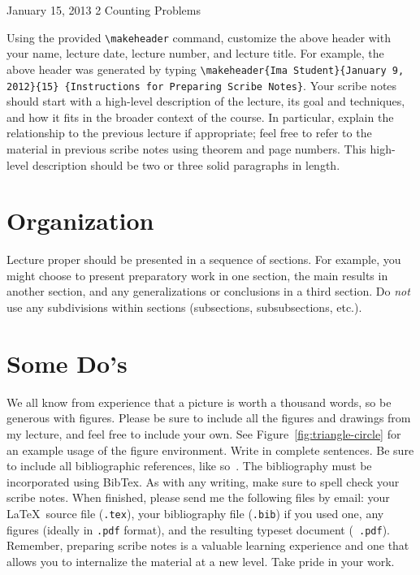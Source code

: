            {January 15, 2013}                          %
           {2}                                       %
           {Counting Problems}  %

\noindent
Using the provided \verb|\makeheader| command, 
customize the above header with your name,
lecture date, lecture number, and lecture title. For
example, the above header was generated by typing 
\verb|\makeheader{Ima Student}{January 9, 2012}{15}|{\tt 
\{Instructions for Preparing Scribe Notes\}}.  Your
scribe notes should start with a high-level description
of the lecture, its goal and techniques, and how it
fits in the broader context of the course. In
particular, explain the relationship to the previous
lecture if appropriate; feel free to refer to the
material in previous scribe notes using theorem and
page numbers.  This high-level description should be
two or three solid paragraphs in length.

\section{Organization}
Lecture proper should be presented in a sequence of
sections. For example, you might choose to present
preparatory work in one section, the main results in
another section, and any generalizations or
conclusions in a third section. Do \emph{not} use
any subdivisions within sections (subsections,
subsubsections, etc.).

\section{Some Do's}
We all know from experience that a picture is worth a
thousand words, so be generous with figures. Please be
sure to include all the figures and drawings 
from my lecture, and feel free to include
your own. See Figure~\ref{fig:triangle-circle} for an
example usage of the figure environment. Write in
complete sentences. Be sure to include all
bibliographic references, like so~\cite{textbook}.  The
bibliography must be incorporated using BibTex.  
As with any writing, make sure to spell check your
scribe notes. When finished, please send me the
following files by email: your \LaTeX\ source file
({\tt .tex}), your bibliography file ({\tt .bib}) if
you used one, any figures (ideally in {\tt .pdf}
format), and the resulting typeset document ({\tt
.pdf}).  Remember, preparing scribe notes is a valuable
learning experience and one that allows you to
internalize the material at a new level. Take pride in
your work. 


